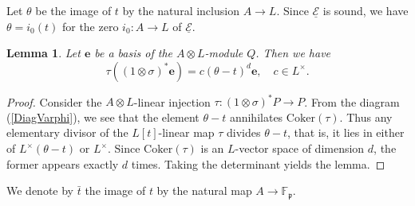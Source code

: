 \documentclass[10pt]{amsart}
\theoremstyle{plain}
\newtheorem{lem}[thm]{Lemma}
\theoremstyle{definition}
\newcommand{\Coker}{\mathrm{Coker}}
\newcommand{\ucE}{\underline{\mathcal{E}}}
\newcommand{\bF}{\mathbb{F}}
\newcommand{\frp}{\mathfrak{p}}
\begin{document}
Let $\theta$ be the image of $t$ by the natural inclusion $A\to L$. Since $\ucE$ is sound,
we have $\theta=i_0(t)$ for the zero $i_{0}:A\to L$ of $\ucE$.


\begin{lem}\label{LemElDivP}
	Let $\mathbf{e}$ be a basis of the $A\otimes L$-module $Q$. Then we have
	\[
	\tau((1\otimes\sigma)^*\mathbf{e})=c(\theta-t)^d \mathbf{e},\quad c\in L^\times.
	\]
\end{lem}
\begin{proof}
	Consider the $A\otimes L$-linear injection $\tau:(1\otimes \sigma)^*P\to P$.
	From the diagram (\ref{DiagVarphi}), we see that the element $\theta-t$ annihilates $\Coker(\tau)$.
	Thus any elementary divisor of the $L[t]$-linear map $\tau$ divides $\theta-t$, that is, it lies in either of $L^\times(\theta-t)$ or $L^\times$.
	Since $\Coker(\tau)$ is an $L$-vector space of dimension $d$, the former appears exactly $d$ times.
	Taking the determinant yields the lemma.
\end{proof}




We denote by $\bar{t}$ the image of $t$ by the natural map $A\to \bF_\frp$.
\end{document}
